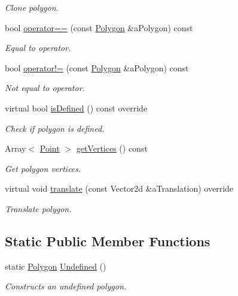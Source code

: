 \begin{DoxyCompactItemize}
\begin{DoxyCompactList}\small\item\em Clone polygon. \end{DoxyCompactList}\item 
bool \hyperlink{classlibrary_1_1math_1_1geom_1_1d2_1_1objects_1_1_polygon_a2d92051aa3535659ec1ca1849ea65fa0}{operator==} (const \hyperlink{classlibrary_1_1math_1_1geom_1_1d2_1_1objects_1_1_polygon}{Polygon} \&a\+Polygon) const
\begin{DoxyCompactList}\small\item\em Equal to operator. \end{DoxyCompactList}\item 
bool \hyperlink{classlibrary_1_1math_1_1geom_1_1d2_1_1objects_1_1_polygon_a904fe22c8a690a6b5eb4f8746602d637}{operator!=} (const \hyperlink{classlibrary_1_1math_1_1geom_1_1d2_1_1objects_1_1_polygon}{Polygon} \&a\+Polygon) const
\begin{DoxyCompactList}\small\item\em Not equal to operator. \end{DoxyCompactList}\item 
virtual bool \hyperlink{classlibrary_1_1math_1_1geom_1_1d2_1_1objects_1_1_polygon_a83e0962f91f0732048e156ad634faaea}{is\+Defined} () const override
\begin{DoxyCompactList}\small\item\em Check if polygon is defined. \end{DoxyCompactList}\item 
Array$<$ \hyperlink{classlibrary_1_1math_1_1geom_1_1d2_1_1objects_1_1_point}{Point} $>$ \hyperlink{classlibrary_1_1math_1_1geom_1_1d2_1_1objects_1_1_polygon_acc13539129eb98b4b77ebd33ad002d4f}{get\+Vertices} () const
\begin{DoxyCompactList}\small\item\em Get polygon vertices. \end{DoxyCompactList}\item 
virtual void \hyperlink{classlibrary_1_1math_1_1geom_1_1d2_1_1objects_1_1_polygon_ae5494a1f838d3c325899b6c46237bca8}{translate} (const Vector2d \&a\+Translation) override
\begin{DoxyCompactList}\small\item\em Translate polygon. \end{DoxyCompactList}\end{DoxyCompactItemize}
\subsection*{Static Public Member Functions}
\begin{DoxyCompactItemize}
\item 
static \hyperlink{classlibrary_1_1math_1_1geom_1_1d2_1_1objects_1_1_polygon}{Polygon} \hyperlink{classlibrary_1_1math_1_1geom_1_1d2_1_1objects_1_1_polygon_a86e2c184f51c1e93fce5a786457b9fc3}{Undefined} ()
\begin{DoxyCompactList}\small\item\em Constructs an undefined polygon. \end{DoxyCompactList}\end{DoxyCompactItemize}
